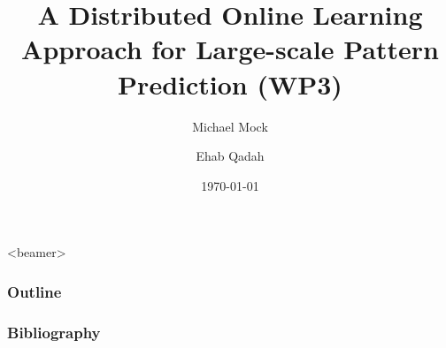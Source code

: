 \documentclass{beamer}
\title{A Distributed Online Learning Approach for Large-scale Pattern Prediction (WP3)}
\author[shortname]{Michael Mock \inst{*} \and Ehab Qadah  \inst{*}}
\institute[shortinst]{\inst{*} Fraunhofer IAIS, Germany \and %
}
\date{\today}
\begin{document}
	
	\frame{\titlepage}

	
	\begin{frame}<beamer>
		\frametitle{Outline}
		\tableofcontents
	\end{frame}
	
	
	

	
	
	\begin{frame}
		\frametitle{Bibliography}
		 
		
		
	\end{frame}
\end{document}
